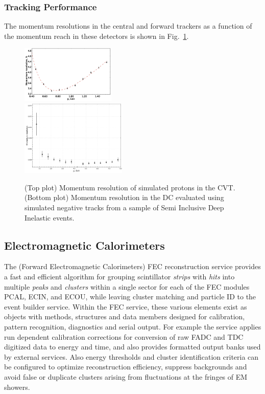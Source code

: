 \documentclass[3p,times,twocolumn]{elsarticle}
\begin{document}
\pagebreak

\subsubsection{Tracking Performance}

The momentum resolutions in the central and forward trackers as a function of the momentum reach
in these detectors is shown in Fig.~\ref{fig:res}.

\begin{figure}[b]
\includegraphics[width=0.4\textwidth,natwidth=610,natheight=642]{pics/fddegipekmpjjiho.png} \\
\includegraphics[width=0.45\textwidth,natwidth=610,natheight=642]{pics/DCRes.png}
\caption{(Top plot) Momentum resolution of simulated protons in the CVT.
(Bottom plot) Momentum resolution in the DC evaluated using simulated negative tracks from a sample of Semi Inclusive
Deep Inelastic events.
}
\label{fig:res}
\end{figure}

\pagebreak
\subsection{Electromagnetic Calorimeters}

The (Forward Electromagnetic Calorimeters) FEC reconstruction service provides a fast and efficient algorithm for grouping scintillator {\it strips} with
{\it hits} into multiple {\it peaks} and {\it clusters} within a single sector for each of the FEC modules PCAL, ECIN,
and ECOU, while leaving cluster matching and particle ID to the event builder service.  Within the FEC service, these
various elements exist as objects with methods, structures and data members designed for calibration, pattern
recognition, diagnostics and serial output.  For example the service applies run dependent calibration corrections for
conversion of raw FADC and TDC digitized data to energy and time, and also provides formatted output banks used by
external services.  Also energy thresholds and cluster identification criteria can be configured to optimize reconstruction
efficiency, suppress backgrounds and avoid false or duplicate clusters arising from fluctuations at the fringes of EM
showers.
\end{document}
